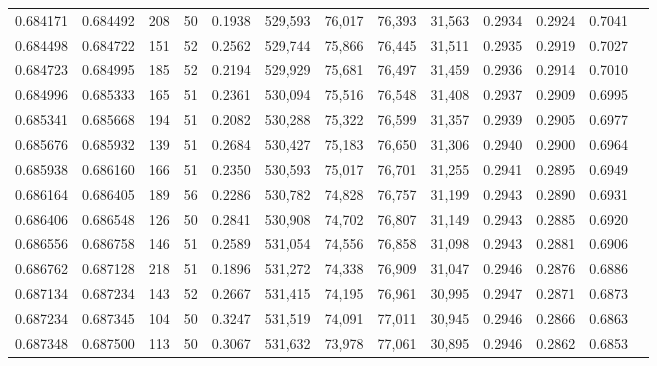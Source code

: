 \begin{tabular}{rrrrrrrrrrrrr}
0.684171 & 0.684492 &   208 &  50 &                                     0.1938 & 529,593 &  76,017 &  76,393 &  31,563 & 0.2934 & 0.2924 & 0.7041 \\
0.684498 & 0.684722 &   151 &  52 &                                     0.2562 & 529,744 &  75,866 &  76,445 &  31,511 & 0.2935 & 0.2919 & 0.7027 \\
0.684723 & 0.684995 &   185 &  52 &                                     0.2194 & 529,929 &  75,681 &  76,497 &  31,459 & 0.2936 & 0.2914 & 0.7010 \\
0.684996 & 0.685333 &   165 &  51 &                                     0.2361 & 530,094 &  75,516 &  76,548 &  31,408 & 0.2937 & 0.2909 & 0.6995 \\
0.685341 & 0.685668 &   194 &  51 &                                     0.2082 & 530,288 &  75,322 &  76,599 &  31,357 & 0.2939 & 0.2905 & 0.6977 \\
0.685676 & 0.685932 &   139 &  51 &                                     0.2684 & 530,427 &  75,183 &  76,650 &  31,306 & 0.2940 & 0.2900 & 0.6964 \\
0.685938 & 0.686160 &   166 &  51 &                                     0.2350 & 530,593 &  75,017 &  76,701 &  31,255 & 0.2941 & 0.2895 & 0.6949 \\
0.686164 & 0.686405 &   189 &  56 &                                     0.2286 & 530,782 &  74,828 &  76,757 &  31,199 & 0.2943 & 0.2890 & 0.6931 \\
0.686406 & 0.686548 &   126 &  50 &                                     0.2841 & 530,908 &  74,702 &  76,807 &  31,149 & 0.2943 & 0.2885 & 0.6920 \\
0.686556 & 0.686758 &   146 &  51 &                                     0.2589 & 531,054 &  74,556 &  76,858 &  31,098 & 0.2943 & 0.2881 & 0.6906 \\
0.686762 & 0.687128 &   218 &  51 &                                     0.1896 & 531,272 &  74,338 &  76,909 &  31,047 & 0.2946 & 0.2876 & 0.6886 \\
0.687134 & 0.687234 &   143 &  52 &                                     0.2667 & 531,415 &  74,195 &  76,961 &  30,995 & 0.2947 & 0.2871 & 0.6873 \\
0.687234 & 0.687345 &   104 &  50 &                                     0.3247 & 531,519 &  74,091 &  77,011 &  30,945 & 0.2946 & 0.2866 & 0.6863 \\
0.687348 & 0.687500 &   113 &  50 &                                     0.3067 & 531,632 &  73,978 &  77,061 &  30,895 & 0.2946 & 0.2862 & 0.6853 \\

\end{tabular}
